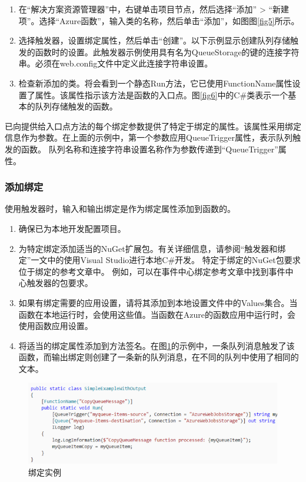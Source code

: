 \begin{enumerate}
	\item 在“解决方案资源管理器”中，右键单击项目节点，然后选择“添加” > “新建项”。选择“Azure函数”，输入类的名称，然后单击“添加”，如图图\ref{fig5}所示。
	\item 选择触发器，设置绑定属性，然后单击“创建”。以下示例显示创建队列存储触发的函数时的设置。此触发器示例使用具有名为QueueStorage的键的连接字符串。必须在web.config文件中定义此连接字符串设置。
	\item 检查新添加的类。将会看到一个静态Run方法，它已使用FunctionName属性设置了属性。该属性指示该方法是函数的入口点。图\ref{fig6}中的C\#类表示一个基本的队列存储触发的函数。	
\end{enumerate}
已向提供给入口点方法的每个绑定参数提供了特定于绑定的属性。该属性采用绑定信息作为参数。在上面的示例中，第一个参数应用QueueTrigger属性，表示队列触发的函数。 队列名称和连接字符串设置名称作为参数传递到“QueueTrigger”属性。

\subsubsection{添加绑定} 
使用触发器时，输入和输出绑定是作为绑定属性添加到函数的。
\begin{enumerate}
	\item 确保已为本地开发配置项目。
	\item 为特定绑定添加适当的NuGet扩展包。有关详细信息，请参阅“触发器和绑定”一文中的使用Visual Studio进行本地C\#开发。 特定于绑定的NuGet包要求位于绑定的参考文章中。 例如，可以在事件中心绑定参考文章中找到事件中心触发器的包要求。
	\item 如果有绑定需要的应用设置，请将其添加到本地设置文件中的Values集合。当函数在本地运行时，会使用这些值。当函数在Azure的函数应用中运行时，会使用函数应用设置。
	\item 将适当的绑定属性添加到方法签名。在图\ref{fig7}的示例中，一条队列消息触发了该函数，而输出绑定则创建了一条新的队列消息，在不同的队列中使用了相同的文本。
\end{enumerate}	
\begin{figure}[!htbp]
	\centering
	\includegraphics[scale=0.6]{figs/7.png}
	\caption{绑定实例}
	\label{fig7}	
\end{figure}

